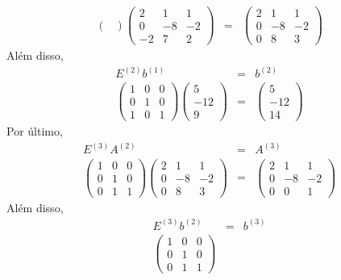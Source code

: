 \begin{exemplo*}
\begin{eqnarray*}
\begin{pmatrix}
		\end{pmatrix}
		\begin{pmatrix}
			2&1&1\\0&-8&-2\\-2&7&2
		\end{pmatrix}
		&
		=
		&
		\begin{pmatrix}
			2&1&1\\0&-8&-2\\0&8&3
		\end{pmatrix}
	\end{eqnarray*}
	Além disso, 
	\begin{eqnarray*}
	   E^{(2)} b^{(1)} &=& b^{(2)}\\
		\begin{pmatrix}
			1&0&0\\0&1&0\\1&0&1
		\end{pmatrix}
		\begin{pmatrix}
			5\\-12\\9
		\end{pmatrix}
		&=&
		\begin{pmatrix}
			5\\-12\\14
		\end{pmatrix}
	\end{eqnarray*}
	Por último,
	\begin{eqnarray*}
		E^{(3)} A^{(2)} & = & A^{(3)}\\
		\begin{pmatrix}
			1&0&0\\0&1&0\\0&1&1
		\end{pmatrix}
		\begin{pmatrix}
			2&1&1\\0&-8&-2\\0&8&3
		\end{pmatrix}
		&
		=
		&
		\begin{pmatrix}
			2&1&1\\0&-8&-2\\0&0&1
		\end{pmatrix}
	\end{eqnarray*}
	Além disso, 
	\begin{eqnarray*}
	   E^{(3)} b^{(2)} &=& b^{(3)}\\
		\begin{pmatrix}
			1&0&0\\0&1&0\\0&1&1
		\end{pmatrix}

\end{eqnarray*}
\end{exemplo*}
